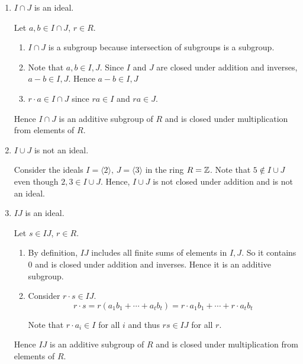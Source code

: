 \documentclass[Notebook.tex]{subfiles}
\begin{document}
\begin{solution}
    \bbni
    \begin{enumerate}[label=(\alph*),ref=\theenumi\alph*]
        \item $I \cap J$ is an ideal. 
        
        Let $a, b \in I \cap J$, $r \in R$.  

        \begin{enumerate}[label=(\roman*),ref=\theenumi\roman*]
            \item $I \cap J$ is a subgroup because intersection of subgroups is a subgroup. 
            \item Note that $a, b \in I, J$. Since $I$ and $J$ are closed under addition and inverses, $a - b \in I, J$. Hence $a - b \in I, J$
            \item $r \cdot a \in I \cap J$ since $ra \in I$ and $ra \in J$. 
        \end{enumerate}

        Hence $I \cap J$ is an additive subgroup of $R$ and is closed under multiplication from elements of $R$. 

        \item $I \cup J$ is not an ideal. 
        
        Consider the ideals $I = \langle 2 \rangle, \, J = \langle 3 \rangle$ in the ring $R = \mathbb Z$. Note that $5 \notin I \cup J$ even though $2,3 \in I \cup J$. Hence, $I \cup J$ is not closed under addition and is not an ideal.

        \item $IJ$ is an ideal. 
        
        Let $s\in IJ$, $r \in R$.  

        \begin{enumerate}[label=(\roman*),ref=\theenumi\roman*]
            \item By definition, $IJ$ includes all finite sums of elements in $I, J$. So it contains $0$ and is closed under addition and inverses. Hence it is an additive subgroup. 
            \item Consider $r \cdot s \in I J$. 
            \[r \cdot s = r (a_1b_1+\cdots+a_tb_t) = r \cdot a_1b_1+\cdots+ r \cdot a_tb_t\]

            Note that $r \cdot a_i \in I$ for all $i$ and thus $rs \in IJ$ for all $r$.  
        \end{enumerate}
        Hence $I J$ is an additive subgroup of $R$ and is closed under multiplication from elements of $R$. 


\end{enumerate}
\end{solution}
\end{document}
